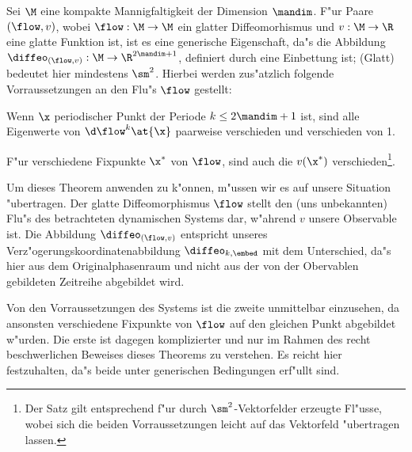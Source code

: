 \begin{theorem}
Sei $\M$ eine kompakte Mannigfaltigkeit der Dimension $\mandim$. F"ur Paare $(\flow,v)$,
wobei  \linebreak[4] $\flow:\M\to\M$ ein  glatter Diffeomorhismus und $v:\M\to\R$ eine glatte Funktion
ist, ist es eine generische Eigenschaft, da"s die 
Abbildung $\diffeo_{(\flow,v)} : \M \to\R^{2\mandim+1}$, definiert durch 
eine Einbettung ist; \metapher(Glatt) bedeutet hier mindestens $\sm^2$.
Hierbei werden zus"atzlich folgende Vorraussetzungen an den Flu"s $\flow$ gestellt:
\begin{myitemize}
\item Wenn $\x$ periodischer Punkt der Periode $k\le 2\mandim+1$ ist, sind alle Eigenwerte
von $\d\flow^k\at{\x}$ paarweise verschieden und verschieden von 1.
\item F"ur verschiedene Fixpunkte $\x^*$ von $\flow$, sind auch die $v(\x^*)$
verschieden\footnote{Der Satz gilt entsprechend f"ur durch $\sm^2$-Vektorfelder erzeugte Fl"usse,
wobei sich die beiden Vorraussetzungen leicht auf das Vektorfeld "ubertragen lassen.}.
\end{myitemize}
\end{theorem}

Um dieses Theorem anwenden zu k"onnen, m"ussen wir es auf unsere Situation
"ubertragen. Der glatte Diffeomorphismus $\flow$ stellt den (uns unbekannten) Flu"s des
betrachteten dynamischen Systems dar, w"ahrend $v$ unsere Observable ist. Die Abbildung
$\diffeo_{(\flow,v)}$ entspricht unseres Verz"ogerungskoordinatenabbildung
$\diffeo_{k,\embed}$ mit dem Unterschied, da"s hier aus dem Originalphasenraum und nicht aus
der von der Obervablen gebildeten Zeitreihe abgebildet wird.

Von den Vorraussetzungen des Systems ist die zweite unmittelbar einzusehen, da ansonsten
verschiedene Fixpunkte von $\flow$ auf den gleichen Punkt abgebildet w"urden. Die erste
ist dagegen komplizierter und nur im Rahmen des recht beschwerlichen Beweises dieses
Theorems zu verstehen. Es reicht hier festzuhalten, da"s beide unter generischen
Bedingungen erf"ullt sind. 

